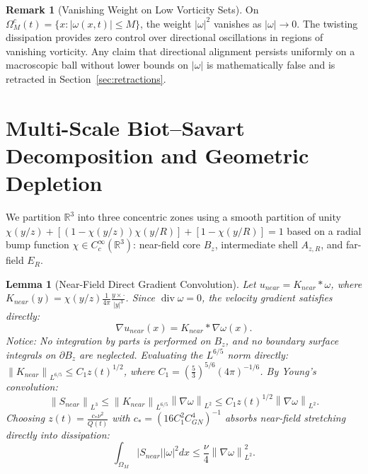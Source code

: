 \documentclass[11pt,reqno]{amsart}
\numberwithin{equation}{section}
\newtheorem{lemma}[theorem]{Lemma}
\theoremstyle{definition}
\newtheorem{remark}[theorem]{Remark}
\newcommand{\R}{\mathbb{R}}
\newcommand{\norm}[1]{\left\lVert#1\right\rVert}
\begin{document}
\begin{remark}[Vanishing Weight on Low Vorticity Sets]
On $\Omega_M^c(t) = \{x : |\omega(x,t)| \le M\}$, the weight $|\omega|^2$ vanishes as $|\omega| \to 0$. The twisting dissipation provides zero control over directional oscillations in regions of vanishing vorticity. Any claim that directional alignment persists uniformly on a macroscopic ball without lower bounds on $|\omega|$ is mathematically false and is retracted in Section~\ref{sec:retractions}.
\end{remark}

\section{Multi-Scale Biot--Savart Decomposition and Geometric Depletion}

We partition $\R^3$ into three concentric zones using a smooth partition of unity $\chi(y/z) + [(1-\chi(y/z))\chi(y/R)] + [1-\chi(y/R)] = 1$ based on a radial bump function $\chi \in C_c^\infty(\R^3)$: near-field core $B_z$, intermediate shell $A_{z,R}$, and far-field $E_R$.

\begin{lemma}[Near-Field Direct Gradient Convolution]\label{lem:near_field}
Let $u_{near} = K_{near} * \omega$, where $K_{near}(y) = \chi(y/z) \frac{1}{4\pi} \frac{y \times \cdot}{|y|^3}$. Since $\operatorname{div} \omega = 0$, the velocity gradient satisfies directly:
\begin{equation}\label{eq:grad_conv}
\nabla u_{near}(x) = K_{near} * \nabla \omega(x).
\end{equation}
\emph{Notice: No integration by parts is performed on $B_z$, and no boundary surface integrals on $\partial B_z$ are neglected.}
Evaluating the $L^{6/5}$ norm directly: $\norm{K_{near}}_{L^{6/5}} \le C_1 z(t)^{1/2}$, where $C_1 = (\frac{5}{3})^{5/6} (4\pi)^{-1/6}$. By Young's convolution:
\begin{equation}\label{eq:near_strain}
\norm{S_{near}}_{L^3} \le \norm{K_{near}}_{L^{6/5}} \norm{\nabla \omega}_{L^2} \le C_1 z(t)^{1/2} \norm{\nabla \omega}_{L^2}.
\end{equation}
Choosing $z(t) = \frac{c_* \nu^2}{Q(t)}$ with $c_* = (16 C_1^2 C_{GN}^4)^{-1}$ absorbs near-field stretching directly into dissipation:
\begin{equation}\label{eq:near_absorb}
\int_{\Omega_M} |S_{near}| |\omega|^2 dx \le \frac{\nu}{4} \norm{\nabla \omega}_{L^2}^2.
\end{equation}
\end{lemma}
\end{document}
